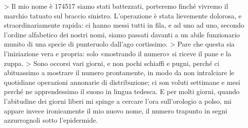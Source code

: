 > Il mio nome è 174517 siamo stati battezzati, porteremo finché vivremo il marchio tatuato sul braccio sinistro.
L'operazione è stata lievemente dolorosa, e straordinariamente rapida: ci hanno messi tutti in fila, e ad uno ad uno, secondo l'ordine alfabetico dei nostri nomi, siamo passati davanti a un abile funzionario munito di una specie di punteruolo dall'ago cortissimo.
> Pare che questa sia l'iniziazione vera e propria: solo «mostrando il numero» si riceve il pane e la zuppa.
> Sono occorsi vari giorni, e non pochi schiaffi e pugni, perché ci abituassimo a mostrare il numero prontamente, in modo da non intralciare le quotidiane operazioni annonarie di distribuzione; ci son voluti settimane e mesi perché ne apprendessimo il suono in lingua tedesca. E per molti giorni, quando l'abitudine dei giorni liberi mi spinge a cercare l'ora sull'orologio a polso, mi appare invece ironicamente il mio nuovo nome, il numero trapunto in segni azzurrognoli sotto l'epidermide.

